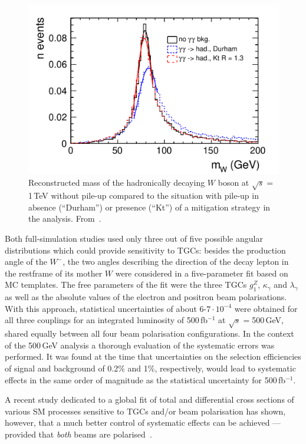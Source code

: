 \begin{figure}
	\centering
		\includegraphics[width=0.95\linewidth]{./chapters/figures/wwjeting.pdf}
		
	\caption{Reconstructed mass of the hadronically decaying $W$ boson at $\sqrt{s}=$1\,TeV without pile-up compared to the situation with pile-up in absence (``Durham'') or presence (``Kt'') of a mitigation strategy in the analysis. From~\cite{Rosca:2016hcq}. 
	}
	\label{fig:WW_overlayremoval}
\end{figure}

Both full-simulation studies used only three out of five possible angular distributions which could provide sensitivity to TGCs: besides the production angle of the $W^-$, the two angles describing the direction of the decay lepton in the restframe of its mother $W$ were considered in a five-parameter fit based on MC templates. The free parameters of the fit were the three TGCs $ g^Z_1$, $\kappa_\gamma$ and $\lambda_\gamma$ as well as the absolute values of the electron and positron beam polarisations. With this approach, statistical uncertainties of about $6$-$7 \cdot 10^{-4}$ were obtained for all three couplings for an integrated luminosity of 500\,fb$^{-1}$ at $\sqrt{s}=$500\,GeV, shared equally between all four beam polarisation configurations.
In the context of the 500\,GeV analysis a thorough evaluation of the systematic errors was performed. It was found at the time that uncertainties on the selection efficiencies of signal and background of 0.2\% and 1\%, respectively, would lead to systematic effects in the same order of magnitude as the statistical uncertainty for 500\,fb$^{-1}$.

A recent study dedicated to a global fit of total and differential cross sections of various SM processes sensitive to TGCs and/or beam polarisation has shown, however, that a much better control of systematic effects can be achieved --- provided that {\em both} beams are polarised~\cite{bib:PhDRobert, Fujii:2018mli}.  

